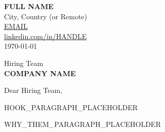 \documentclass[10pt, letterpaper]{article}
\begin{document}

\textbf{FULL NAME}\\
City, Country (or Remote)\\
\href{mailto:EMAIL}{EMAIL}\\
\href{https://linkedin.com/in/HANDLE}{linkedin.com/in/HANDLE}\\
\today

\vspace{16pt}

Hiring Team\\
\textbf{COMPANY NAME}\\

\vspace{16pt}

Dear Hiring Team,

\vspace{8pt}


HOOK_PARAGRAPH_PLACEHOLDER

\vspace{8pt}


WHY_THEM_PARAGRAPH_PLACEHOLDER

\vspace{8pt}

\end{document}
